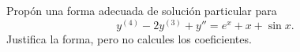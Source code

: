 Propón una forma adecuada de solución particular para
\[y^{(4)}-2y^{(3)}+y''=e^x+x+\sin x.\]
Justifica la forma, pero no calcules los coeficientes.
